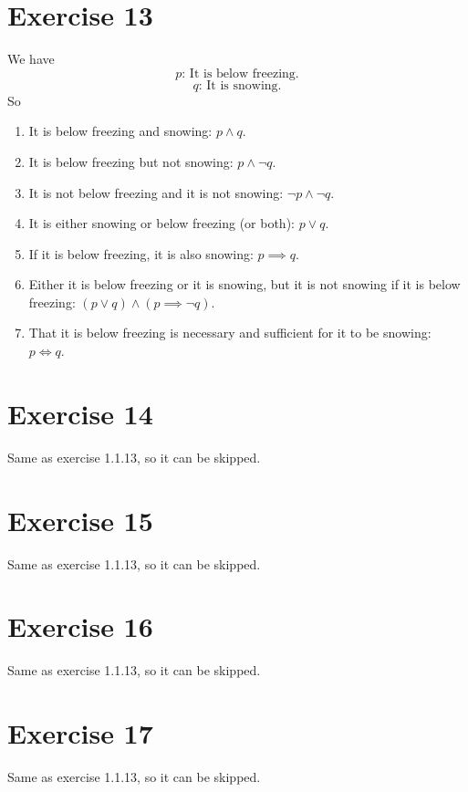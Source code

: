 \documentclass[12pt]{article}
\begin{document}
    \section*{Exercise 13}
    We have 
    \[ p \text{: It is below freezing.} \]
    \[ q \text{: It is snowing.} \]
    So
    \begin{enumerate}[label=\textbf{\alph*.}]
        \item
            It is below freezing and snowing:
            $p \land q$.
        \item
            It is below freezing but not snowing:
            $p \land \neg q$.
        \item 
            It is not below freezing and it is not snowing:
            $\neg p \land \neg q$.
        \item 
            It is either snowing or below freezing (or both):
            $p \lor q$.
        \item
            If it is below freezing, it is also snowing:
            $p \implies q$.
        \item
            Either it is below freezing or it is snowing, but it is
            not snowing if it is below freezing:
            $(p \lor q) \land (p \implies \neg q)$.
        \item
            That it is below freezing is necessary and sufficient
            for it to be snowing:
            $p \iff q$.
    \end{enumerate}


    \section*{Exercise 14}
    Same as exercise 1.1.13, so it can be skipped.


    \section*{Exercise 15}
    Same as exercise 1.1.13, so it can be skipped.

    \section*{Exercise 16}
    Same as exercise 1.1.13, so it can be skipped.

    
    \section*{Exercise 17}
    Same as exercise 1.1.13, so it can be skipped.
\end{document}
